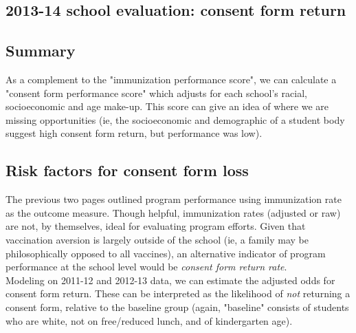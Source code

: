 \begin{multicols}{2}

\end{multicols}
\begin{center}
\section*{2013-14 school evaluation: consent form return}
\end{center}
\begin{multicols}{2}


\subsection*{Summary}
As a complement to the "immunization performance score", we can calculate a "consent form performance score" which adjusts for each school's racial, socioeconomic and age make-up.  This score can give an idea of where we are missing opportunities (ie, the socioeconomic and demographic of a student body suggest high consent form return, but performance was low). \\


\subsection*{Risk factors for consent form loss}

The previous two pages outlined program performance using immunization rate as the outcome measure.  Though helpful, immunization rates (adjusted or raw) are not, by themselves, ideal for evaluating program efforts.  Given that vaccination aversion is largely outside of the school (ie, a family may be philosophically opposed to all vaccines), an alternative indicator of program performance at the school level would be \emph{consent form return rate}. \\

Modeling on 2011-12 and 2012-13 data, we can estimate the adjusted odds for consent form return.  These can be interpreted as the likelihood of \emph{not} returning a consent form, relative to the baseline group (again, "baseline" consists of students who are white, not on free/reduced lunch, and of kindergarten age). \\



\end{multicols}
